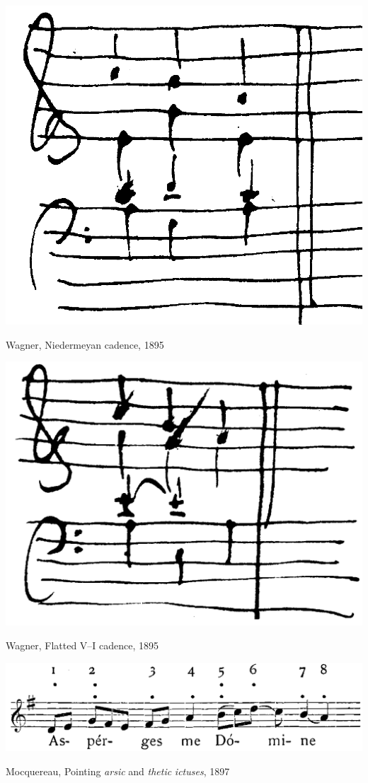 \newpage

\vspace*{\fill}

\begin{example}
  \centering
  \includegraphics[width=.4\linewidth]{c/3/ex/wagner_majorcadence.png}
  \caption{Wagner, Niedermeyan cadence, 1895}
  \label{mus:wagner_majorcadence}
\end{example}

\vspace*{\fill}

\begin{example}
  \centering
  \includegraphics[width=.4\linewidth]{c/3/ex/wagner_minorcadence.png}
  \caption{Wagner, Flatted V--I cadence, 1895}
  \label{mus:wagner_minorcadence}
\end{example}

\vspace*{\fill}

\begin{example}
  \centering
  \includegraphics[width=.6\linewidth]{c/3/ex/moc_punct_128.png}
  \caption{Mocquereau, Pointing \emph{arsic} and \emph{thetic} \emph{ictuses}, 1897}
  \label{mus:moc_punctuation}
\end{example}

\vspace*{\fill}

\newpage

